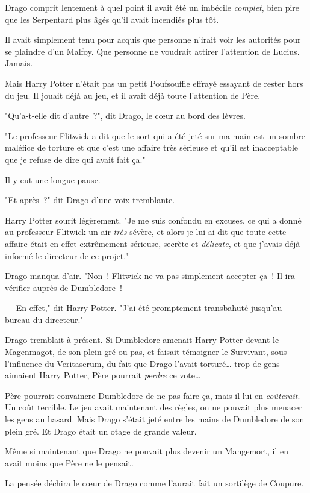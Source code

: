 Drago comprit lentement à quel point il avait été un imbécile \emph{complet}, bien pire que les Serpentard plus âgés qu'il avait incendiés plus tôt.

Il avait simplement tenu pour acquis que personne n'irait voir les autorités pour se plaindre d'un Malfoy. Que personne ne voudrait attirer l'attention de Lucius. Jamais.

Mais Harry Potter n'était pas un petit Poufsouffle effrayé essayant de rester hors du jeu. Il jouait déjà au jeu, et il avait déjà toute l'attention de Père.

"Qu'a-t-elle dit d'autre~?", dit Drago, le cœur au bord des lèvres.

"Le professeur Flitwick a dit que le sort qui a été jeté sur ma main est un sombre maléfice de torture et que c'est une affaire très sérieuse et qu'il est inacceptable que je refuse de dire qui avait fait ça."

Il y eut une longue pause.

"Et après~?" dit Drago d'une voix tremblante.

Harry Potter sourit légèrement. "Je me suis confondu en excuses, ce qui a donné au professeur Flitwick un air \emph{très} sévère, et alors je lui ai dit que toute cette affaire était en effet extrêmement sérieuse, secrète et \emph{délicate}, et que j'avais déjà informé le directeur de ce projet."

Drago manqua d'air. "Non~! Flitwick ne va pas simplement accepter ça~! Il ira vérifier auprès de Dumbledore~!

--- En effet," dit Harry Potter. "J'ai été promptement transbahuté jusqu'au bureau du directeur."

Drago tremblait à présent. Si Dumbledore amenait Harry Potter devant le Magenmagot, de son plein gré ou pas, et faisait témoigner le Survivant, sous l'influence du Veritaserum, du fait que Drago l'avait torturé… trop de gens aimaient Harry Potter, Père pourrait \emph{perdre} ce vote…

Père pourrait convaincre Dumbledore de ne pas faire ça, mais il lui en \emph{coûterait}. Un coût terrible. Le jeu avait maintenant des règles, on ne pouvait plus menacer les gens au hasard. Mais Drago s'était jeté entre les mains de Dumbledore de son plein gré. Et Drago était un otage de grande valeur.

Même si maintenant que Drago ne pouvait plus devenir un Mangemort, il en avait moins que Père ne le pensait.

La pensée déchira le cœur de Drago comme l'aurait fait un sortilège de Coupure.

